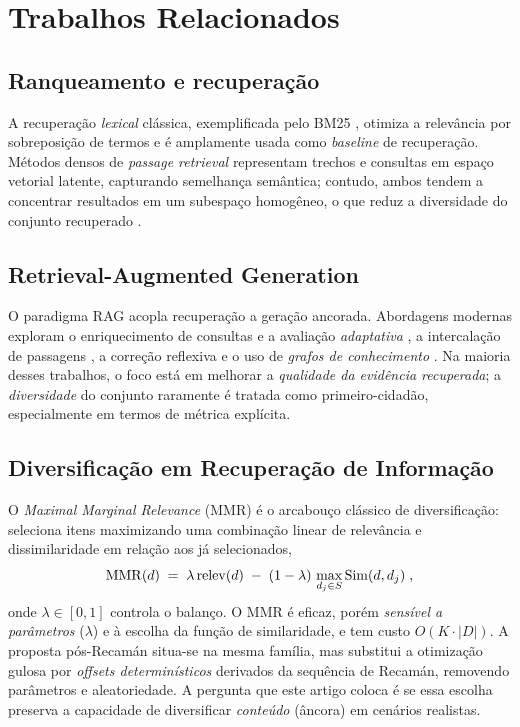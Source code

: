 \section{Trabalhos Relacionados}
\label{sec:rel}

\subsection{Ranqueamento e recuperação}

A recuperação \emph{lexical} clássica, exemplificada pelo BM25
\citep{RobertsonZaragoza2009BM25}, otimiza a relevância por sobreposição de
termos e é amplamente usada como \emph{baseline} de recuperação. Métodos densos
de \emph{passage retrieval} \citep[cf.][]{KhattabZaharia2020ColBERT} representam
trechos e consultas em espaço vetorial latente, capturando semelhança semântica;
contudo, ambos tendem a concentrar resultados em um subespaço homogêneo, o que
reduz a diversidade do conjunto recuperado \citep{He2023RethinkingRetrieval}.

\subsection{Retrieval-Augmented Generation}

O paradigma RAG \citep{Lewis2020RAG} acopla recuperação a geração ancorada.
Abordagens modernas exploram o enriquecimento de consultas e a avaliação
\emph{adaptativa} \citep{Jeong2024AdaptiveRAG}, a intercalação de passagens
\citep{Trivedi2023Interleaving}, a correção reflexiva \citep{Yan2024CRAG} e o
uso de \emph{grafos de conhecimento} \citep{Edge2024GraphRAG}. Na maioria desses
trabalhos, o foco está em melhorar a \emph{qualidade da evidência recuperada};
a \emph{diversidade} do conjunto raramente é tratada como primeiro-cidadão,
especialmente em termos de métrica explícita.

\subsection{Diversificação em Recuperação de Informação}

O \emph{Maximal Marginal Relevance} (MMR) \citep{CarbonellGoldstein1998MMR} é o
arcabouço clássico de diversificação: seleciona itens maximizando uma combinação
linear de relevância e dissimilaridade em relação aos já selecionados,
\[
\label{eq:mmr}
\mathrm{MMR}(d) \;=\; \lambda\,\mathrm{relev}(d) \;-\; (1-\lambda)\,
\max_{d_j\in S} \mathrm{Sim}(d, d_j) \; ,
\]
onde $\lambda\in[0,1]$ controla o balanço. O MMR é eficaz, porém \emph{sensível a
parâmetros} ($\lambda$) e à escolha da função de similaridade, e tem custo
$O(K\cdot|D|)$. A proposta pós-Recamán \citep{Alekseyev2022RecamanCousins} situa-se
na mesma família, mas substitui a otimização gulosa por \emph{offsets
determinísticos} derivados da sequência de Recamán, removendo parâmetros e
aleatoriedade. A pergunta que este artigo coloca é se essa escolha preserva a
capacidade de diversificar \emph{conteúdo} (âncora) em cenários realistas.


